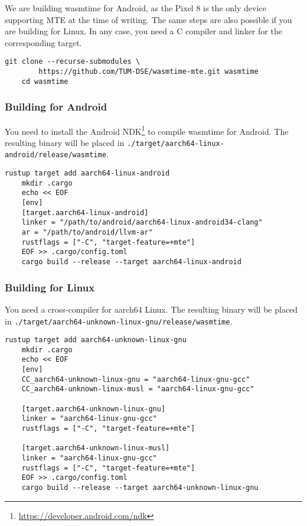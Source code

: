 We are building wasmtime for Android, as the Pixel 8 is the only device supporting \ac{MTE} at the time of writing.
The same steps are also possible if you are building for Linux.
In any case, you need a C compiler and linker for the corresponding target.

\begin{lstlisting}[label={lst:building-wasmtime}]
    git clone --recurse-submodules \
        https://github.com/TUM-DSE/wasmtime-mte.git wasmtime
    cd wasmtime
\end{lstlisting}

\subsubsection{Building for Android}

You need to install the Android NDK\footnote{\url{https://developer.android.com/ndk}} to compile wasmtime for Android.
The resulting binary will be placed in \texttt{./target/aarch64-linux-android/release/wasmtime}.

\begin{lstlisting}[label={lst:configuring-wasmtime-android}]
    rustup target add aarch64-linux-android
    mkdir .cargo
    echo << EOF
    [env]
    [target.aarch64-linux-android]
    linker = "/path/to/android/aarch64-linux-android34-clang"
    ar = "/path/to/android/llvm-ar"
    rustflags = ["-C", "target-feature=+mte"]
    EOF >> .cargo/config.toml
    cargo build --release --target aarch64-linux-android
\end{lstlisting}

\subsubsection{Building for Linux}

You need a cross-compiler for aarch64 Linux.
The resulting binary will be placed in \texttt{./target/aarch64-unknown-linux-gnu/release/wasmtime}.

\begin{lstlisting}[label={lst:configuring-wasmtime-linux}]
    rustup target add aarch64-unknown-linux-gnu
    mkdir .cargo
    echo << EOF
    [env]
    CC_aarch64-unknown-linux-gnu = "aarch64-linux-gnu-gcc"
    CC_aarch64-unknown-linux-musl = "aarch64-linux-gnu-gcc"

    [target.aarch64-unknown-linux-gnu]
    linker = "aarch64-linux-gnu-gcc"
    rustflags = ["-C", "target-feature=+mte"]

    [target.aarch64-unknown-linux-musl]
    linker = "aarch64-linux-gnu-gcc"
    rustflags = ["-C", "target-feature=+mte"]
    EOF >> .cargo/config.toml
    cargo build --release --target aarch64-unknown-linux-gnu
\end{lstlisting}


